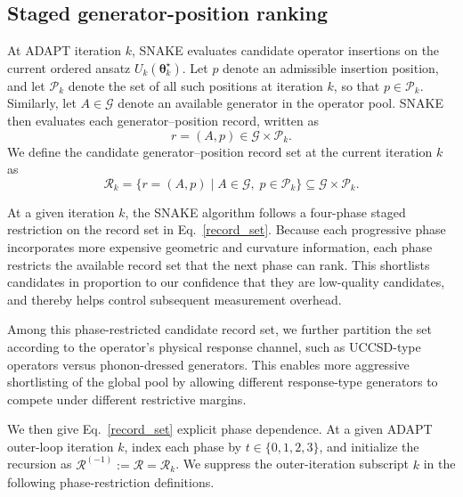 \documentclass[
  reprint,
  amsmath,
  amssymb,
  aps,
  pra,
  nofootinbib,
  superscriptaddress,
  floatfix
]{revtex4-2}
\newcommand{\Pcal}{\mathcal{P}}
\begin{document}
\subsection{Staged generator-position ranking}
%
At ADAPT iteration \(k\), \textsc{SNAKE} evaluates candidate operator insertions on the current ordered ansatz \(U_k(\boldsymbol\theta_k^\star)\). Let \(p\) denote an admissible insertion position, and let \(\mathcal P_k\) denote the set of all such positions at iteration \(k\), so that \(p\in\mathcal P_k\). Similarly, let \(A\in\mathcal G\) denote an available generator in the operator pool. \textsc{SNAKE} then evaluates each generator--position record, written as
\[
r=(A,p)\in\mathcal G\times\mathcal P_k .
\]
We define the candidate generator--position record set at the current iteration \(k\) as
\begin{equation}
\mathcal R_k
=
\{r=(A,p)\mid A\in\mathcal G,\;p\in\Pcal_k\}
\subseteq\mathcal G\times\Pcal_k .
\label{record_set}
\end{equation}

At a given iteration \(k\), the \textsc{SNAKE} algorithm follows a four-phase staged restriction on the record set in Eq.~\eqref{record_set}. Because each progressive phase incorporates more expensive geometric and curvature information, each phase restricts the available record set that the next phase can rank. This shortlists candidates in proportion to our confidence that they are low-quality candidates, and thereby helps control subsequent measurement overhead.

Among this phase-restricted candidate record set, we further partition the set according to the operator's physical response channel, such as UCCSD-type operators versus phonon-dressed generators. This enables more aggressive shortlisting of the global pool by allowing different response-type generators to compete under different restrictive margins.

We then give Eq.~\eqref{record_set} explicit phase dependence. At a given ADAPT outer-loop iteration \(k\), index each phase by \(t\in\{0,1,2,3\}\), and initialize the recursion as \(\mathcal R^{(-1)}:=\mathcal R=\mathcal R_k\). We suppress the outer-iteration subscript \(k\) in the following phase-restriction definitions.
\end{document}

